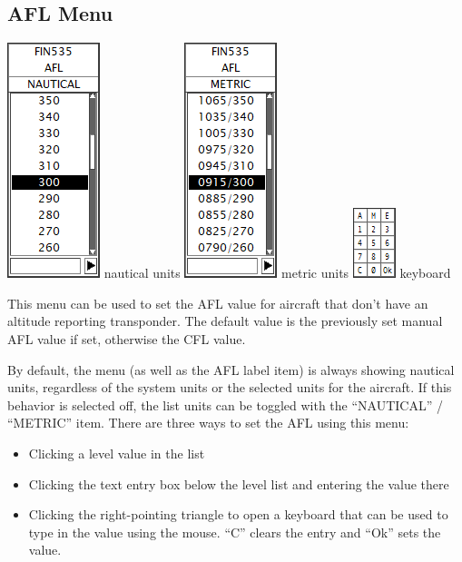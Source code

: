 \documentclass[11pt,a4paper,oldfontcommands]{memoir}
\begin{document}
\subsection{AFL Menu}
\label{menu:afl}
\includegraphics{img/afl.png}
nautical units
\includegraphics{img/aflm.png}
metric units
\includegraphics{img/kbd.png}
keyboard

This menu can be used to set the AFL value for aircraft that don’t have an altitude reporting transponder.
The default value is the previously set manual AFL value if set, otherwise the CFL value.

By default, the menu (as well as the AFL label item) is always showing nautical units, regardless of the
system units or the selected units for the aircraft. If this behavior is selected off, the list units can be
toggled with the “NAUTICAL” / “METRIC” item. There are three ways to set the AFL using this menu:

\begin{itemize}
        \item Clicking a level value in the list
        \item Clicking the text entry box below the level list and entering the value there
        \item Clicking the right-pointing triangle to open a keyboard that can be used to type in the value using the mouse. “C” clears the entry and “Ok” sets the value.
\end{itemize}
\end{document}
